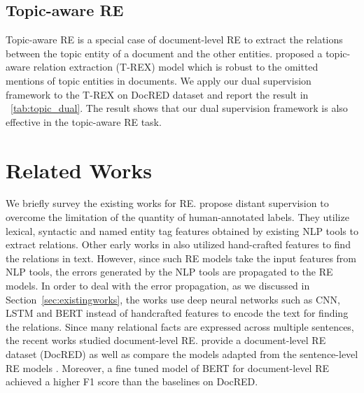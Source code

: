 \documentclass[11pt]{article}
\begin{document}
\subsection{Topic-aware RE}
Topic-aware RE is a special case of document-level RE to extract the relations between the topic entity of a document and the other entities.
 proposed a topic-aware relation
extraction (T-REX) model which is robust to the omitted mentions
of topic entities in documents.
We apply our dual supervision framework to the T-REX on DocRED dataset and report the result in \tablename~\ref{tab:topic_dual}.
The result shows that our dual supervision framework is also effective in the topic-aware RE task.


 \section{Related Works}
We briefly survey the existing works for RE.
 propose distant supervision to overcome the limitation of the quantity of human-annotated labels.
They utilize lexical, syntactic and named entity tag features obtained by existing NLP tools to extract relations.
Other early works in \cite{riedel2010modeling,hoffmann2011knowledge} also utilized hand-crafted features to find the relations in text.
However, since such RE models take the input features from NLP tools, the errors generated by the NLP tools are propagated to the RE models.
In order to deal with the error propagation, as we discussed in Section~\ref{sec:existingworks}, the works \cite{lin2016neural,zeng2014relation,zeng2015distant,sorokin2017context,wang2019fine} use deep neural networks such as CNN, LSTM and BERT instead of handcrafted features to encode the text for finding the relations.
Since many relational facts are expressed across multiple sentences, the recent works \cite{yao2019docred,wang2019fine} studied document-level RE.
 provide a document-level RE dataset (DocRED)  as well as compare the models adapted from the sentence-level RE models \cite{zeng2014relation,hochreiter1997long,cai2016bidirectional,sorokin2017context}.
Moreover, a fine tuned model \cite{wang2019fine} of BERT \cite{devlin2018bert} for document-level RE achieved a higher F1 score than the baselines on DocRED.
\end{document}
